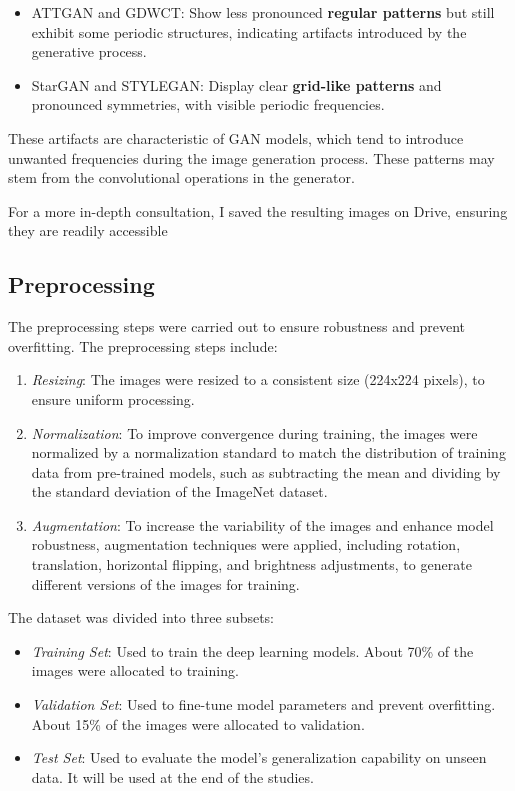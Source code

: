 \documentclass[12pt]{article}
\providecommand{\tightlist}{%
      \setlength{\itemsep}{0pt}\setlength{\parskip}{0pt}}
\begin{document}
\begin{itemize}
\tightlist
\item
  ATTGAN and GDWCT: Show less pronounced \textbf{regular patterns} but
  still exhibit some periodic structures, indicating artifacts
  introduced by the generative process.
\item
  StarGAN and STYLEGAN: Display clear \textbf{grid-like patterns} and
  pronounced symmetries, with visible periodic frequencies.
\end{itemize}

These artifacts are characteristic of GAN models, which tend to
introduce unwanted frequencies during the image generation process.
These patterns may stem from the convolutional operations in the
generator.

For a more in-depth consultation, I saved the resulting images on Drive,
ensuring they are readily accessible

    \subsection{Preprocessing}\label{preprocessing}

    The preprocessing steps were carried out to ensure robustness and prevent overfitting. The preprocessing
steps include:

\begin{enumerate}
\def\labelenumi{\arabic{enumi}.}
\tightlist
\item
  \emph{Resizing}: The images were resized to a consistent size (224x224
  pixels), to ensure uniform processing.
\item
  \emph{Normalization}: To improve convergence during training, the
  images were normalized by a normalization standard to match the
  distribution of training data from pre-trained models, such as
  subtracting the mean and dividing by the standard deviation of the
  ImageNet dataset.
\item
  \emph{Augmentation}: To increase the variability of the images and
  enhance model robustness, augmentation techniques were applied,
  including rotation, translation, horizontal flipping, and brightness
  adjustments, to generate different versions of the images for
  training.
\end{enumerate}

The dataset was divided into three subsets:

\begin{itemize}
\tightlist
\item
  \emph{Training Set}: Used to train the deep learning models. About
  70\% of the images were allocated to training.
\item
  \emph{Validation Set}: Used to fine-tune model parameters and prevent
  overfitting. About 15\% of the images were allocated to validation.
\item
  \emph{Test Set}: Used to evaluate the model's generalization
  capability on unseen data. It will be used at the end of the studies.
\end{itemize}
\end{document}
